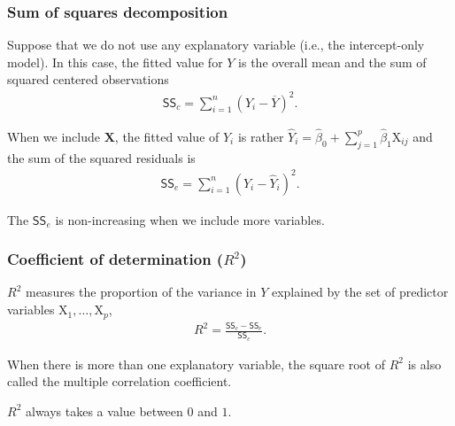 \documentclass{beamer}
\begin{document}
\begin{frame}
\frametitle{Sum of squares decomposition}
\bi
\item Suppose that we do not use any explanatory variable (i.e., the intercept-only model). In this case, the fitted value for $Y$ is the overall mean and the sum of squared centered observations
\begin{align*}
\mathsf{SS}_c=\sum_{i=1}^n (Y_i-\overline{Y})^2.
\end{align*}
\item When we include $\mathbf{X}$, the fitted value of $Y_i$ is rather $\widehat{Y}_i=\widehat{\beta}_0+\sum_{j=1}^p\widehat{\beta}_1 \mathrm{X}_{ij}$ and the sum of the squared residuals is
\begin{align*}
\mathsf{SS}_e=\sum_{i=1}^n (Y_i-\widehat{Y}_i)^2.
\end{align*}
\item The $\mathsf{SS}_e$ is non-increasing when we include more variables.
\ei
\end{frame}
% 
% 


\begin{frame}
\frametitle{Coefficient of determination ($R^2$)}
\bi
\item $R^2$ measures the  proportion of the variance in $Y$ explained by the set of predictor variables $\mathrm{X}_1, \ldots, \mathrm{X}_p$,
\begin{align*}
R^2=\frac{\mathsf{SS}_c-\mathsf{SS}_e}{\mathsf{SS}_c}.                                                     \end{align*}
\item When there is more than one explanatory variable, the square root of $R^2$ is also called the
\alert{multiple correlation coefficient}. 
\item $R^2$ always takes a value between $0$ and $1$.
\ei
\end{frame}
\end{document}
